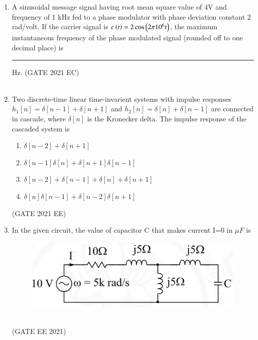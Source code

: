 \begin{enumerate}[label=\thechapter.\arabic*,ref=\thechapter.\theenumi]
\item A sinusoidal message signal having root mean square value of 4V and frequency of 1 kHz fed to a phase modulator with phase deviation constant 2 rad/volt. If the carrier signal is $c\left(t\right) = 2\cos \left(2\pi 10^6 t\right)$, the maximum instantaneous frequency of the phase modulated signal (rounded off to one decimal place) is \rule{1cm}{0.05mm} Hz. \hfill(GATE 2021 EC)\\
\solution\\

\pagebreak
\item Two discrete-time linear time-invarient systems with impulse responses $h_1[n]=\delta[n-1]+\delta[n+1]$ and $h_2[n]=\delta[n]+\delta[n-1]$ are connected in cascade, where $\delta[n]$ is the Kronecker delta. The impulse response of the cascaded system is   \\
\begin{enumerate}[label=(\alph*)]
    \item $\delta[n-2]+\delta[n+1]$
    \item $\delta[n-1]\delta[n]+\delta[n+1]\delta[n-1]$
    \item $\delta[n-2]+\delta[n-1]+\delta[n]+\delta[n+1]$
    \item $\delta[n]\delta[n-1]+\delta[n-2]\delta[n+1]$
\end{enumerate} \hfill(GATE 2021 EE)\\
\solution

\pagebreak
\item In the given circuit, the value of capacitor C that makes current
  I=0 in $\mu F$ is \\
  \begin{figure}[h!]
   \includegraphics[width=1\linewidth
    ]{2021/EE/14/figs/qf1.png}
  \end{figure}\\
		\hfill(GATE EE 2021)
		\solution

		\pagebreak
\end{enumerate}
